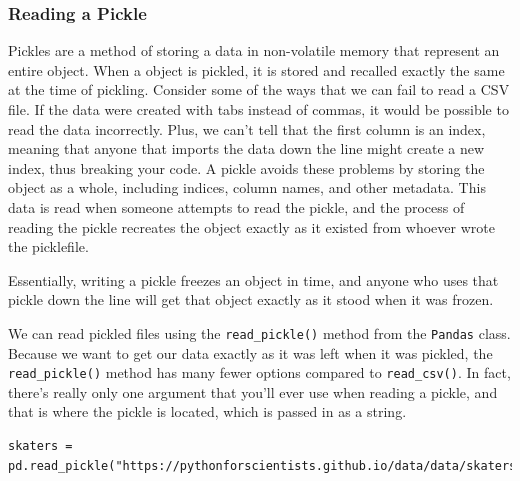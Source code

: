 \subsubsection{Reading a Pickle}
Pickles are a method of storing a data in non-volatile memory that represent an entire  object. When a  object is pickled, it is stored and recalled exactly the same at the time of pickling. Consider some of the ways that we can fail to read a CSV file. If the data were created with tabs instead of commas, it would be possible to read the data incorrectly. Plus, we can't tell  that the first column is an index, meaning that anyone that imports the data down the line might create a new index, thus breaking your code. A pickle avoids these problems by storing the object as a whole, including indices, column names, and other metadata. This data is read when someone attempts to read the pickle, and the process of reading the pickle recreates the object exactly as it existed from whoever wrote the picklefile.\par
Essentially, writing a pickle freezes an object in time, and anyone who uses that pickle down the line will get that object exactly as it stood when it was frozen.\par
We can read pickled files using the \verb|read_pickle()| method from the \verb|Pandas| class. Because we want to get our data exactly as it was left when it was pickled, the \verb|read_pickle()| method has many fewer options compared to \verb|read_csv()|. In fact, there's really only one argument that you'll ever use when reading a pickle, and that is where the pickle is located, which is passed in as a string.\par
\begin{lstlisting}[style=pippython]
skaters = pd.read_pickle("https://pythonforscientists.github.io/data/data/skaters.pkl")
\end{lstlisting}
